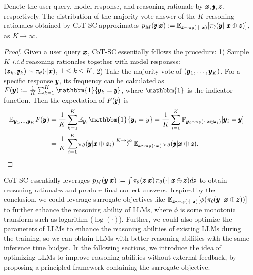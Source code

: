 \begin{proposition}\label{prop:cot-sc}
    Denote the user query, model response, and reasoning rationale by $\pmb{x}, \pmb{y},\pmb{z}$, respectively. 
    The distribution of the majority vote answer of the $K$ reasoning rationales obtained by CoT-SC approximates $p_{M}(\pmb{y} | \pmb{x}):= \mathbb{E}_{\pmb{z}\sim\operatorname{\pi_\theta}(\cdot|~\pmb{x})}[\operatorname{\pi_\theta}(\pmb{y}|~\pmb{x}\oplus \pmb{z})]$, as $K \rightarrow \infty$.
\end{proposition}
\begin{proof}
    Given a user query $\pmb{x}$, CoT-SC essentially follows the procedure: 1) Sample $K$ \textit{i.i.d} reasoning rationales together with model responses:
    $(\pmb{z}_k, \pmb{y}_k) \sim \pi_\theta (\cdot | \pmb{x}),~1 \leq k \leq K$.
    2) Take the majority vote of $(\pmb{y}_1,\ldots, \pmb{y}_K)$.
    For a specific response $\pmb{y}$, its frequency can be calculated as $F(\py):= \frac{1}{K}\sum^K_{k=1} \mathbbm{1} \{\py_k = \py\} $, where $\mathbbm{1}$ is the indicator function. Then the expectation of $F(\pmb{y})$ is 
    \begin{equation*}
        \begin{split}
            \E_{\py_1,\ldots,\py_K} F(\py) &= \frac{1}{K}\sum^K_{k=1} \E_{\py_i} \mathbbm{1} \{\py_i = y\} = \frac{1}{K}\sum^K_{i=1} \prob_{\py_i\sim \llm(\cdot |\px\oplus \pz_i)}[\py_i = \py] \\
            &= \frac{1}{K}\sum^K_{i=1} \llm(\py| \px\oplus \pz_i) \overset{K\rightarrow\infty}{\longrightarrow} \E_{\pz\sim \llm(\cdot|\px)}\llm(\py|\px\oplus \pz).
        \end{split}
    \end{equation*}
\end{proof}
CoT-SC essentially leverages $p_{M}(\pmb{y} | \pmb{x}):= \int\operatorname{\pi_\theta}(\pmb{z}|\pmb{x})\operatorname{\pi_\theta}(\cdot|~\pmb{x}\oplus \pmb{z})d\pmb{z}$  
to obtain reasoning rationales and produce final correct answers.
Inspired by the conclusion, 
we could leverage surrogate objectives like $\mathbb{E}_{\pmb{z}\sim\operatorname{\pi_\theta}(\cdot|~\pmb{x})}[\phi(\operatorname{\pi_\theta}(\pmb{y}|~\pmb{x}\oplus \pmb{z}))]$ to further enhance the reasoning ability of LLMs, where $\phi$ is some monotonic transform such as logarithm ($\log(\cdot)$).
Further, we could also optimize the parameters of LLMs to enhance the reasoning abilities of existing LLMs during the training, so we can obtain LLMs with better reasoning abilities with the same inference time budget. 
In the following sections, we introduce the idea of optimizing LLMs to improve reasoning abilities without external feedback, by proposing a principled framework containing the surrogate objective.
